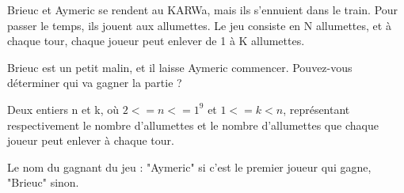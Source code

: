 \problemname{\problemyamlname}

Brieuc et Aymeric se rendent au KARWa, mais ils s'ennuient dans le train. Pour passer le temps, ils jouent aux allumettes. Le jeu consiste en N allumettes,
et à chaque tour, chaque joueur peut enlever de 1 à K allumettes.

Brieuc est un petit malin, et il laisse Aymeric commencer. Pouvez-vous déterminer qui va gagner la partie ?

\begin{Input}
    Deux entiers n et k, où $2 <= n <= 1^9$ et $1 <= k < n$, représentant respectivement le nombre d'allumettes et le nombre d'allumettes que chaque joueur peut enlever à chaque tour.
\end{Input}

\begin{Output}
    Le nom du gagnant du jeu : "Aymeric" si c'est le premier joueur qui gagne, "Brieuc" sinon.
\end{Output}

